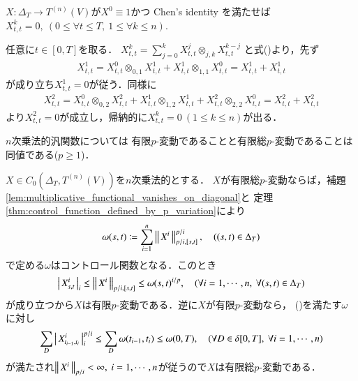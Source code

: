 	\begin{screen}
		\begin{lem}\label{lem:multiplicative_functional_vanishes_on_diagonal}
			$X:\Delta_T \longrightarrow T^{(n)}(V)$が$X^0 \equiv 1$かつ
			Chen's identity を満たせば$X^k_{t,t} = 0,
			\ (0 \leq \forall t \leq T,\ 1 \leq \forall k \leq n)$.
		\end{lem}
	\end{screen}
	
	\begin{prf}
		任意に$t \in [0,T]$を取る．
		$X^k_{t,t} = \sum_{j=0}^{k} X^j_{t,t} \otimes_{j,k} X^{k-j}_{t,t}$
		と式()より，先ず
		\begin{align}
			X^1_{t,t} = X^0_{t,t} \otimes_{0,1} X^1_{t,t} + X^1_{t,t} \otimes_{1,1} X^0_{t,t}
			= X^1_{t,t} + X^1_{t,t}
		\end{align}
		が成り立ち$X^1_{t,t} = 0$が従う．同様に
		\begin{align}
			X^2_{t,t} = X^0_{t,t} \otimes_{0,2} X^2_{t,t} + X^1_{t,t} \otimes_{1,2} X^1_{t,t}
				+ X^2_{t,t} \otimes_{2,2} X^0_{t,t}
			= X^2_{t,t} + X^2_{t,t}
		\end{align}
		より$X^2_{t,t} = 0$が成立し，帰納的に$X^k_{t,t} = 0\ (1 \leq k \leq n)$が出る．
		\QED
	\end{prf}
	
	\begin{screen}
		\begin{thm}\label{thm:fin_p_var_and_fin_ttl_p_var_is_equiv_for_multiplicative}
			$n$次乗法的汎関数については
			有限$p$-変動であることと有限総$p$-変動であることは同値である($p \geq 1$)．
		\end{thm}
	\end{screen}
	
	\begin{prf}
		$X \in C_0 \left(\Delta_T,T^{(n)}(V) \right)$を$n$次乗法的とする．
		$X$が有限総$p$-変動ならば，補題\ref{lem:multiplicative_functional_vanishes_on_diagonal}と
		定理\ref{thm:control_function_defined_by_p_variation}により
		\begin{align}
			\omega(s,t) \coloneqq \sum_{i=1}^n \left\|\, X^i\, \right\|_{p/i,[s,t]}^{p/i},
			\quad ((s,t) \in \Delta_T)
		\end{align}
		で定める$\omega$はコントロール関数となる．このとき
		\begin{align}
			\left|\, X^i_{s,t}\, \right|_{i}
			\leq \left\|\, X^i\, \right\|_{p/i,[s,t]}
			\leq \omega(s,t)^{i/p},
			\quad (\forall i = 1,\cdots,n,\ \forall (s,t) \in \Delta_T)
		\end{align}
		が成り立つから$X$は有限$p$-変動である．逆に$X$が有限$p$-変動なら，
		()を満たす$\omega$に対し
		\begin{align}
			\sum_D \left|\, X^i_{t_{i-1},t_i}\, \right|_{i}^{p/i}
			\leq \sum_D \omega(t_{i-1},t_i)
			\leq \omega(0,T),
			\quad (\forall D \in \delta[0,T],\ \forall i=1,\cdots,n)
		\end{align}
		が満たされ$\Norm{X^i}{p/i} < \infty,\ i=1,\cdots,n$が従うので$X$は有限総$p$-変動である．
		\QED
	\end{prf}
	
